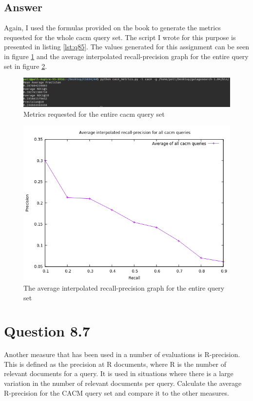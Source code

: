 \documentclass{article}
\begin{document}
	\subsection*{Answer}
	Again, I used the formulas provided on the book to generate the metrics requested for the whole cacm query set. The script I wrote for this purpose is presented in listing \ref{lst:q85}. The values generated for this assignment can be seen in figure \ref{fig:q85_1} and the average interpolated recall-precision graph for the entire query set in figure \ref{fig:q85_2}.
	
	\begin{figure}[h]
		\includegraphics[width=\linewidth]{q85.png}
		\caption{Metrics requested for the entire cacm query set}
		\label{fig:q85_1}
	\end{figure}
	\begin{figure}[h]
		\includegraphics[width=\linewidth]{q85_1.png}
		\caption{The average interpolated recall-precision graph for the entire query set}
		\label{fig:q85_2}
	\end{figure}
	
	\section*{Question 8.7}
	Another measure that has been used in a number of evaluations is R-precision. This is defined as the precision at R documents, where R is the number of relevant documents for a query. It is used in situations where there is a large variation in the number of relevant documents per query. Calculate the average R-precision for the CACM query set and compare it to the other measures.
\end{document}

